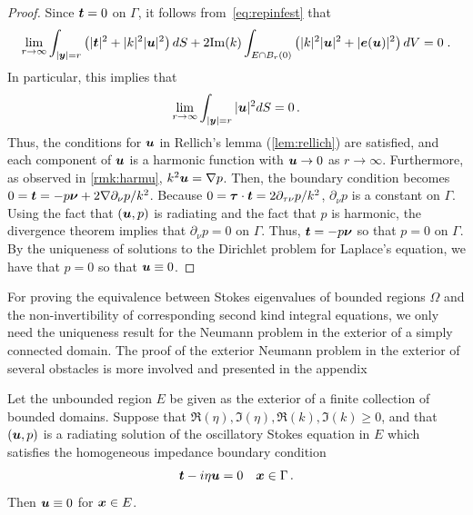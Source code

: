 \begin{proof}
Since ${\boldsymbol t} = 0$ on $\Gamma$, it follows
from~\cref{eq:repinfest} that
\begin{equation}
\lim_{r\to\infty}
\int_{|{\boldsymbol y}|=r} \left( |{\boldsymbol t}|^2 + |k|^2 |{\boldsymbol u}|^2 \right) dS +
2 {\textrm{\textup{Im}}}(k) \int_{E \cap B_{r}(0)} \left(|k|^2 |{\boldsymbol u}|^2 + |{\boldsymbol e}({\boldsymbol u})|^2 \right)
dV = 0 \; . \nonumber
\end{equation} 
In particular, this implies that
\begin{equation}
\lim_{r\to\infty} \int_{|{\boldsymbol y}|=r} |{\boldsymbol u}|^2 dS = 0 \, . \nonumber
\end{equation}
Thus, the conditions for ${\boldsymbol u}$ in Rellich's lemma (\cref{lem:rellich})
are satisfied, and each component of ${\boldsymbol u}$ is a harmonic function
with ${\boldsymbol u} \to 0$ as $r \to \infty$. Furthermore, as observed
in \cref{rmk:harmu}, $k^2 {\boldsymbol u} = \nabla p$. Then, the boundary
condition becomes $0 = {\boldsymbol t} = -p {\boldsymbol \nu} + 2 \nabla \partial_\nu p/k^2$.
Because $0 = {\boldsymbol \tau} \cdot {\boldsymbol t} = 2\partial_{\tau\nu} p/k^2$,
$\partial_\nu p $ is a constant on $\Gamma$. Using the
fact that $({\boldsymbol u},p)$ is radiating and the fact that $p$ is harmonic,
the divergence theorem implies that $\partial_\nu p=0$ on $\Gamma$.
Thus, ${\boldsymbol t} = -p{\boldsymbol \nu}$ so that $p = 0$ on $\Gamma$. By the uniqueness
of solutions to the Dirichlet problem for Laplace's equation,
we have that $p=0$ so that ${\boldsymbol u} \equiv 0$.
\end{proof}

\begin{remark}
For proving the equivalence between Stokes eigenvalues
of bounded regions $\Omega$ and the non-invertibility
of corresponding second kind integral equations, we only
need the uniqueness result for the Neumann problem in the 
exterior of a simply connected domain. 
The proof of the exterior Neumann problem in the exterior of several
obstacles is more involved and presented in the 
appendix~\cite{app:neuuniqueness}
\end{remark}

\begin{thrm}
  Let the unbounded region $E$ be given as the exterior
  of a finite collection of bounded domains.
  Suppose that $\Re(\eta),\Im(\eta),\Re(k),\Im(k) \geq 0$, and that
  $({\boldsymbol u},p)$ is a radiating solution of the
  oscillatory Stokes equation in $E$ which satisfies
  the homogeneous impedance boundary condition
  \begin{equation}
{\boldsymbol t} - i \eta {\boldsymbol u} = 0 \quad {\boldsymbol x} \in \Gamma \, . \nonumber
\end{equation}
Then ${\boldsymbol u} \equiv 0$ for ${\boldsymbol x} \in E$.
\end{thrm}

